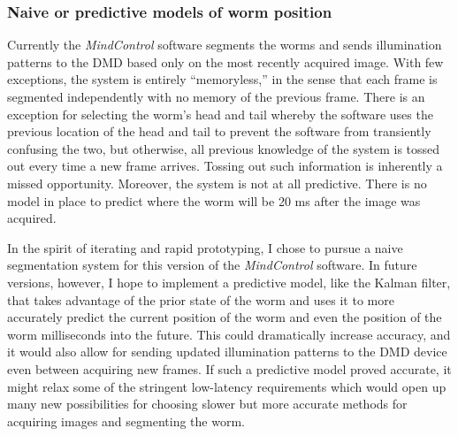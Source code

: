 \subsubsection{Naive or predictive models of worm position}
Currently the \emph{MindControl} software segments the worms and sends illumination patterns to the DMD based only on the most recently acquired image. With few exceptions, the system is entirely ``memoryless,'' in the sense that each frame is segmented independently with no memory of the previous frame. There is an exception for selecting the worm's head and tail whereby the software uses the previous location of the head and tail to prevent the software from transiently confusing the two, but otherwise, all previous knowledge of the system is tossed out every time a new frame arrives. Tossing out such information is inherently a missed opportunity. Moreover, the system is not at all predictive. There is no model in place to predict where the worm will be 20 ms after the image was acquired.  

In the spirit of iterating and rapid prototyping, I chose to pursue a naive segmentation system for this version of the \emph{MindControl} software. In future versions, however, I hope to implement a predictive model, like the Kalman filter, that takes advantage of the prior state of the worm and uses it to more accurately predict the current position of the worm and even the position of the worm milliseconds into the future. This could dramatically increase accuracy, and it would also allow for sending updated illumination patterns to the DMD device even between acquiring new frames. If such a predictive model proved accurate, it might relax some of the stringent low-latency requirements which would open up many new possibilities for choosing slower but more accurate methods for acquiring images and segmenting the worm.



